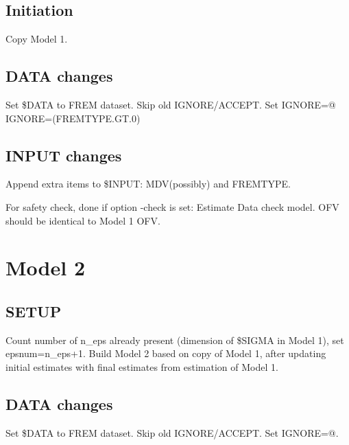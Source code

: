 \subsection{Initiation}
Copy Model 1.

\subsection{DATA changes}
Set \$DATA to FREM dataset. Skip old IGNORE/ACCEPT. Set IGNORE=@ IGNORE=(FREMTYPE.GT.0)

\subsection{INPUT changes}
Append extra items to \$INPUT: MDV(possibly) and FREMTYPE.

For safety check, done if option -check is set: Estimate Data check model. OFV should be identical to Model 1 OFV.


\section{Model 2}



\subsection{SETUP}
Count number of n\_eps already present (dimension of \$SIGMA in Model 1), set epsnum=n\_eps+1.
Build Model 2 based on copy of Model 1, after updating initial estimates with final estimates
from estimation of Model 1.

\subsection{DATA changes}
Set \$DATA to FREM dataset. Skip old IGNORE/ACCEPT. Set IGNORE=@.

